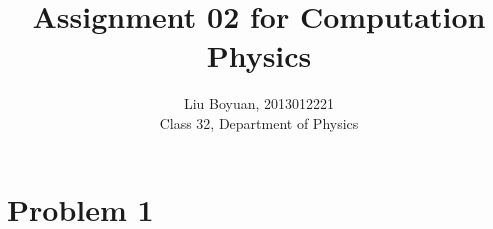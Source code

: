 \documentclass[10pt,a4paper,twocolumn]{article}
\author{Liu Boyuan, 2013012221\\
Class 32, Department of Physics}
\begin{document}
\title{Assignment 02 for Computation Physics}
\maketitle
\section*{Problem 1}
\end{document}
